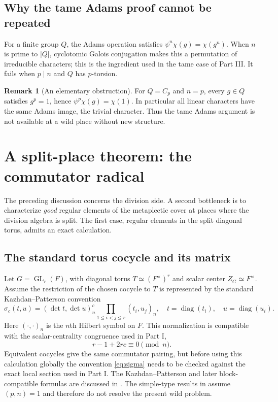 \documentclass[11pt]{article}
\newcommand{\GL}{\operatorname{GL}}
\theoremstyle{plain}
\theoremstyle{definition}
\newtheorem{remark}[theorem]{Remark}
\begin{document}
\subsection{Why the tame Adams proof cannot be repeated}\label{subsec:adams}
For a finite group $Q$, the Adams operation satisfies
$\psi^n\chi(g)=\chi(g^n)$.  When $n$ is prime to $|Q|$,
cyclotomic Galois conjugation makes this a permutation of irreducible
characters; this is the ingredient used in the tame case of Part III.
It fails when $p\mid n$ and $Q$ has $p$-torsion.

\begin{remark}[An elementary obstruction]
For $Q=C_p$ and $n=p$, every $g\in Q$ satisfies $g^p=1$, hence
$\psi^p\chi(g)=\chi(1)$.  In particular all linear characters have the
same Adams image, the trivial character.  Thus the tame Adams
argument is not available at a wild place without new structure.
\end{remark}

\section{A split-place theorem: the commutator radical}\label{sec:split}
The preceding discussion concerns the division side.  A second
bottleneck is to characterize \emph{good} regular elements of the
metaplectic cover at places where the division algebra is split.
The first case, regular elements in the split diagonal torus, admits
an exact calculation.

\subsection{The standard torus cocycle and its matrix}\label{subsec:cocycle}
Let $G=\GL_r(F)$, with diagonal torus $T\simeq(F^\times)^r$ and
scalar center $Z_G\simeq F^\times$.  Assume the restriction of the
chosen cocycle to $T$ is represented by the standard
Kazhdan--Patterson convention
\begin{equation}\label{eq:sigma}
 \sigma_c(t,u)=(\det t,\det u)_n^c
 \prod_{1\le i<j\le r}(t_i,u_j)_n,
 \quad t=\operatorname{diag}(t_i),\quad u=\operatorname{diag}(u_i).
\end{equation}
Here $(\cdot,\cdot)_n$ is the $n$th Hilbert symbol on $F$.  This
normalization is compatible with the scalar-centrality congruence
used in Part I,
\begin{equation}\label{eq:scalar}
 r-1+2rc\equiv0\pmod n.
\end{equation}
Equivalent cocycles give the same commutator pairing, but before
using this calculation globally the convention \eqref{eq:sigma}
needs to be checked against the exact local section used in Part I.
The Kazhdan--Patterson and later block-compatible formulas
are discussed in \cite{FK86,Takeda,ZouTypes}.  The simple-type
results in \cite{ZouTypes} assume $(p,n)=1$ and therefore do not
resolve the present wild problem.
\end{document}
